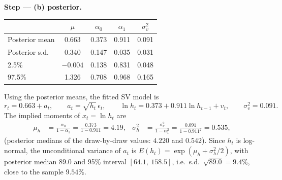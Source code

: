 \documentclass[11pt,a4paper]{article}
\newcommand{\passo}[2]{\par\smallskip\noindent\textbf{Step --- #1.}~#2}
\begin{document}
\begin{sol}
\passo{(b) posterior}{}
\begin{center}\small
\begin{tabular}{lcccc}
\toprule
 & $\mu$ & $\alpha_0$ & $\alpha_1$ & $\sigma_v^2$\\
\midrule
Posterior mean & 0.663 & 0.373 & 0.911 & 0.091\\
Posterior s.d. & 0.340 & 0.147 & 0.035 & 0.031\\
2.5\% & $-0.004$ & 0.138 & 0.831 & 0.048\\
97.5\% & 1.326 & 0.708 & 0.968 & 0.165\\
\bottomrule
\end{tabular}
\end{center}
Using the posterior means, the fitted SV model is
\begin{equation}\label{q124:sv} r_t=0.663+a_t,\qquad a_t=\sqrt{h_t}\,\epsilon_t,\qquad \ln h_t=0.373+0.911\ln h_{t-1}+v_t,\qquad \sigma_v^2=0.091 . \end{equation}
The implied moments of $x_t=\ln h_t$ are
\begin{align*}
\mu_h &= \frac{\alpha_0}{1-\alpha_1} = \frac{0.373}{1-0.911} = 4.19, &
\sigma_h^2 &= \frac{\sigma_v^2}{1-\alpha_1^2} = \frac{0.091}{1-0.911^2} = 0.535,
\end{align*}
(posterior medians of the draw-by-draw values: $4.220$ and $0.542$). Since $h_t$ is log-normal, the
unconditional variance of $a_t$ is $E(h_t)=\exp(\mu_h+\sigma_h^2/2)$, with posterior median $89.0$ and 95\%
interval $[64.1,\ 158.5]$, i.e.\ s.d.\ $\sqrt{89.0}=9.4\%$, close to the sample $9.54\%$.


\end{sol}
\end{document}
